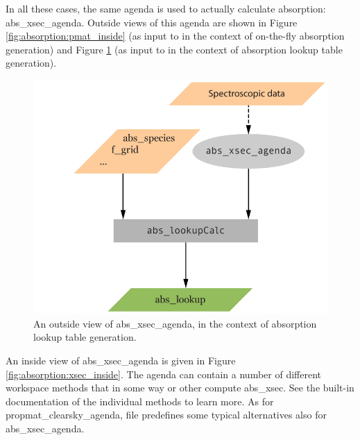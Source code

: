 In all these cases, the same agenda is used to actually calculate
absorption: abs\_xsec\_agenda. Outside views of this agenda are shown
in Figure \ref{fig:absorption:pmat_inside} (as input to
 in the context of on-the-fly
absorption generation) and Figure \ref{fig:absorption:xsec_in_lookup}
(as input to  in the context of absorption
lookup table generation).

\begin{figure}
 \begin{center}
  \includegraphics[scale=0.7]{abs_lookupCalc}
  \caption{An outside view of abs\_xsec\_agenda, in the context of
    absorption lookup table generation.}
  \label{fig:absorption:xsec_in_lookup}
 \end{center}
\end{figure}

An inside view of abs\_xsec\_agenda is given in Figure
\ref{fig:absorption:xsec_inside}.  The agenda can contain a number of
different workspace methods that in some way or other compute
abs\_xsec. See the built-in documentation of the individual methods to
learn more. As for propmat\_clearsky\_agenda, file
 predefines some typical alternatives also for
abs\_xsec\_agenda.

